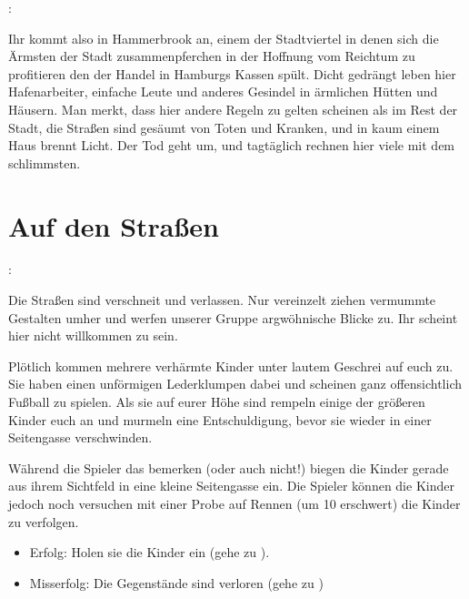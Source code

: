 

:

Ihr kommt also in Hammerbrook an, einem der Stadtviertel in denen sich die Ärmsten der Stadt zusammenpferchen in der Hoffnung vom Reichtum zu profitieren den der Handel in Hamburgs Kassen spült. Dicht gedrängt leben hier Hafenarbeiter, einfache Leute und anderes Gesindel in ärmlichen Hütten und Häusern. Man merkt, dass hier andere Regeln zu gelten scheinen als im Rest der Stadt, die Straßen sind gesäumt von Toten und Kranken, und in kaum einem Haus brennt Licht. Der Tod geht um, und tagtäglich rechnen hier viele mit dem schlimmsten.

\section{Auf den Straßen}
\label{straße}

:

Die Straßen sind verschneit und verlassen. Nur vereinzelt ziehen vermummte Gestalten umher und werfen unserer Gruppe argwöhnische Blicke zu. Ihr scheint hier nicht willkommen zu sein.

 

Plötlich kommen mehrere verhärmte Kinder unter lautem Geschrei auf euch zu. Sie haben einen unförmigen Lederklumpen dabei und scheinen ganz offensichtlich Fußball zu spielen. Als sie auf eurer Höhe sind rempeln einige der größeren Kinder euch an und murmeln eine Entschuldigung, bevor sie wieder in einer Seitengasse verschwinden.


Während die Spieler das bemerken (oder auch nicht!) biegen die Kinder gerade aus ihrem Sichtfeld in eine kleine Seitengasse ein. Die Spieler können die Kinder jedoch noch versuchen mit einer Probe auf Rennen (um 10 erschwert) die Kinder zu verfolgen.

\begin{itemize}
  \item Erfolg: Holen sie die Kinder ein (gehe zu \blue{\ref{eingeholt}}).
  \item Misserfolg: Die Gegenstände sind verloren (gehe zu \blue{\ref{neingeholt}})
\end{itemize}

